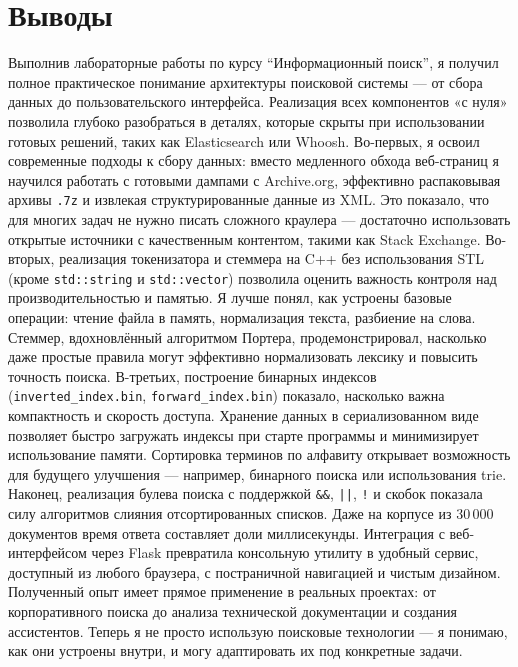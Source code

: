 \section{Выводы}
Выполнив лабораторные работы по курсу \enquote{Информационный поиск}, я получил полное практическое понимание архитектуры поисковой системы — от сбора данных до пользовательского интерфейса. Реализация всех компонентов «с нуля» позволила глубоко разобраться в деталях, которые скрыты при использовании готовых решений, таких как Elasticsearch или Whoosh.
Во-первых, я освоил современные подходы к сбору данных: вместо медленного обхода веб-страниц я научился работать с готовыми дампами с Archive.org, эффективно распаковывая архивы \texttt{.7z} и извлекая структурированные данные из XML. Это показало, что для многих задач не нужно писать сложного краулера — достаточно использовать открытые источники с качественным контентом, такими как Stack Exchange.
Во-вторых, реализация токенизатора и стеммера на C++ без использования STL (кроме \texttt{std::string} и \texttt{std::vector}) позволила оценить важность контроля над производительностью и памятью. Я лучше понял, как устроены базовые операции: чтение файла в память, нормализация текста, разбиение на слова. Стеммер, вдохновлённый алгоритмом Портера, продемонстрировал, насколько даже простые правила могут эффективно нормализовать лексику и повысить точность поиска.
В-третьих, построение бинарных индексов (\texttt{inverted\_index.bin}, \texttt{forward\_index.bin}) показало, насколько важна компактность и скорость доступа. Хранение данных в сериализованном виде позволяет быстро загружать индексы при старте программы и минимизирует использование памяти. Сортировка терминов по алфавиту открывает возможность для будущего улучшения — например, бинарного поиска или использования trie.
Наконец, реализация булева поиска с поддержкой \texttt{\&\&}, \texttt{||}, \texttt{!} и скобок показала силу алгоритмов слияния отсортированных списков. Даже на корпусе из 30\,000 документов время ответа составляет доли миллисекунды. Интеграция с веб-интерфейсом через Flask превратила консольную утилиту в удобный сервис, доступный из любого браузера, с постраничной навигацией и чистым дизайном.
Полученный опыт имеет прямое применение в реальных проектах: от корпоративного поиска до анализа технической документации и создания ассистентов. Теперь я не просто использую поисковые технологии — я понимаю, как они устроены внутри, и могу адаптировать их под конкретные задачи.
\pagebreak
